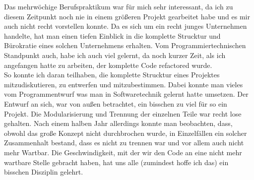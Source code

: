 Das mehrwöchige Berufspraktikum war für mich sehr interessant, da ich zu diesem Zeitpunkt noch nie in einem größeren Projekt gearbeitet habe und es mir auch nicht recht vorstellen konnte. Da es sich um ein recht junges Unternehmen handelte, hat man einen tiefen Einblick in die komplette Strucktur und Bürokratie eines solchen Unternehmens erhalten. Vom Programmiertechnischen Standpunkt auch, habe ich auch viel gelernt, da noch kurzer Zeit, als ich angefangen hatte zu arbeiten, der komplette Code refactored wurde.\\
So konnte ich daran teilhaben, die komplette Strucktur eines Projektes mitzudiskutieren, zu entwerfen und mitzubestimmen. Dabei konnte man vieles vom Programmentwurf was man in Softwaretechnik gelernt hatte umsetzen. Der Entwurf an sich, war von außen betrachtet, ein bisschen zu viel für so ein Projekt. Die Modularisierung und Trennung der einzelnen Teile war recht lose gehalten. Nach einem halben Jahr allerdings konnte man beobachten, dass, obwohl das große Konzept nicht durchbrochen wurde, in Einzelfällen ein solcher Zusammenhalt bestand, dass es nicht zu trennen war und vor allem auch nicht mehr Wartbar. Die Geschwindigkeit, mit der wir den Code an eine nicht mehr wartbare Stelle gebracht haben, hat uns alle (zumindest hoffe ich das) ein bisschen Disziplin gelehrt.

